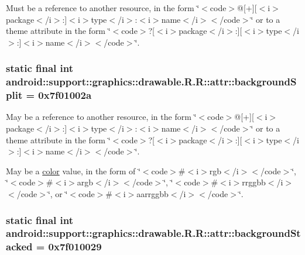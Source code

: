 Must be a reference to another resource, in the form \char`\"{}$<$code$>$@\mbox{[}+\mbox{]}\mbox{[}$<$i$>$package$<$/i$>$:\mbox{]}$<$i$>$type$<$/i$>$:$<$i$>$name$<$/i$>$$<$/code$>$\char`\"{} or to a theme attribute in the form \char`\"{}$<$code$>$?\mbox{[}$<$i$>$package$<$/i$>$:\mbox{]}\mbox{[}$<$i$>$type$<$/i$>$:\mbox{]}$<$i$>$name$<$/i$>$$<$/code$>$\char`\"{}. \hypertarget{classandroid_1_1support_1_1graphics_1_1drawable_1_1_r_1_1attr_c6c56c819041e89cfc1ff1426e3b0305}{
\subsubsection[{backgroundSplit}]{\setlength{\rightskip}{0pt plus 5cm}static final int android::support::graphics::drawable.R.R::attr::backgroundSplit = 0x7f01002a}}
\label{classandroid_1_1support_1_1graphics_1_1drawable_1_1_r_1_1attr_c6c56c819041e89cfc1ff1426e3b0305}


May be a reference to another resource, in the form \char`\"{}$<$code$>$@\mbox{[}+\mbox{]}\mbox{[}$<$i$>$package$<$/i$>$:\mbox{]}$<$i$>$type$<$/i$>$:$<$i$>$name$<$/i$>$$<$/code$>$\char`\"{} or to a theme attribute in the form \char`\"{}$<$code$>$?\mbox{[}$<$i$>$package$<$/i$>$:\mbox{]}\mbox{[}$<$i$>$type$<$/i$>$:\mbox{]}$<$i$>$name$<$/i$>$$<$/code$>$\char`\"{}. 

May be a \hyperlink{classandroid_1_1support_1_1graphics_1_1drawable_1_1_r_1_1color}{color} value, in the form of \char`\"{}$<$code$>$\#$<$i$>$rgb$<$/i$>$$<$/code$>$\char`\"{}, \char`\"{}$<$code$>$\#$<$i$>$argb$<$/i$>$$<$/code$>$\char`\"{}, \char`\"{}$<$code$>$\#$<$i$>$rrggbb$<$/i$>$$<$/code$>$\char`\"{}, or \char`\"{}$<$code$>$\#$<$i$>$aarrggbb$<$/i$>$$<$/code$>$\char`\"{}. \hypertarget{classandroid_1_1support_1_1graphics_1_1drawable_1_1_r_1_1attr_23f3c068803df9b78657558fdb821ccc}{
\subsubsection[{backgroundStacked}]{\setlength{\rightskip}{0pt plus 5cm}static final int android::support::graphics::drawable.R.R::attr::backgroundStacked = 0x7f010029}}
\label{classandroid_1_1support_1_1graphics_1_1drawable_1_1_r_1_1attr_23f3c068803df9b78657558fdb821ccc}


